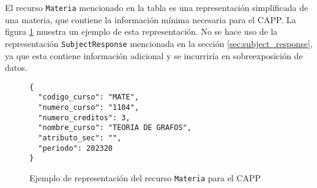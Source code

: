 El recurso \verb|Materia| mencionado en la tabla es una representación simplificada de una materia, que contiene la información mínima necesaria para el \gls{CAPP}. La figura \ref{lst:subject_capp} muestra un ejemplo de esta representación. No se hace uso de la representación \verb|SubjectResponse| mencionada en la sección \ref{sec:subject_response}, %
ya que esta contiene información adicional y se incurriría en sobreexposición de datos.

\begin{figure}[h]
	\centering
	\begin{verbatim}
{
  "codigo_curso": "MATE",
  "numero_curso": "1104",
  "numero_creditos": 3,
  "nombre_curso": "TEORIA DE GRAFOS",
  "atributo_sec": "",
  "periodo": 202320
}
  \end{verbatim}
	\caption{Ejemplo de representación del recurso \texttt{Materia} para el \gls{CAPP}}
	\label{lst:subject_capp}
\end{figure}
